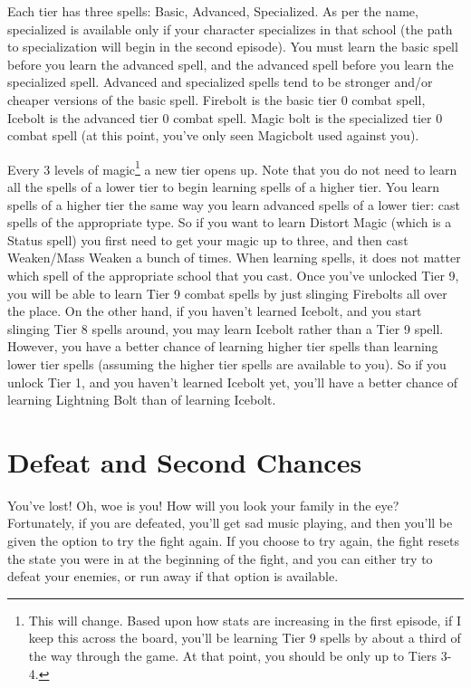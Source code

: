 \documentclass{report}
\begin{document}
\begin{itemize}
\begin{itemize}
Each tier has three spells: Basic, Advanced, Specialized. As per the name, specialized is available only if your character specializes in that school (the path to specialization will begin in the second episode). You must learn the basic spell before you learn the advanced spell, and the advanced spell before you learn the specialized spell. Advanced and specialized spells tend to be stronger and/or cheaper versions of the basic spell. Firebolt is the basic tier 0 combat spell, Icebolt is the advanced tier 0 combat spell. Magic bolt is the specialized tier 0 combat spell (at this point, you've only seen Magicbolt used against you).


Every 3 levels of magic\footnote{This will change. Based upon how stats are increasing in the first episode, if I keep this across the board, you'll be learning Tier 9 spells by about a third of the way through the game. At that point, you should be only up to Tiers 3-4.} 
a new tier opens up. Note that you do not need to learn all the spells of a lower tier to begin learning spells of a higher tier. You learn spells of a higher tier the same way you learn advanced spells of a lower tier: cast spells of the appropriate type. So if you want to learn Distort Magic (which is a Status spell) you first need to get your magic up to three, and then cast Weaken/Mass Weaken a bunch of times.  
When learning spells, it does not matter which spell of the appropriate school that you cast. Once you've unlocked Tier 9, you will be able to learn Tier 9 combat spells by just slinging Firebolts all over the place. On the other hand, if you haven't learned Icebolt, and you start slinging Tier 8 spells around, you may learn Icebolt rather than a Tier 9 spell. However, you have a better chance of learning higher tier spells than learning lower tier spells (assuming the higher tier spells are available to you). So if you unlock Tier 1, and you haven't learned Icebolt yet, you'll have a better chance of learning Lightning Bolt than of learning Icebolt.

\section{Defeat and Second Chances}

You've lost! Oh, woe is you! How will you look your family in the eye? 
Fortunately, if you are defeated, you'll get sad music playing, and then you'll
be given the option to try the fight again. If you choose to try again, the fight
resets the state you were in at the beginning of the fight, and you can either
try to defeat your enemies, or run away if that option is available.


\end{itemize}
\end{itemize}
\end{document}
